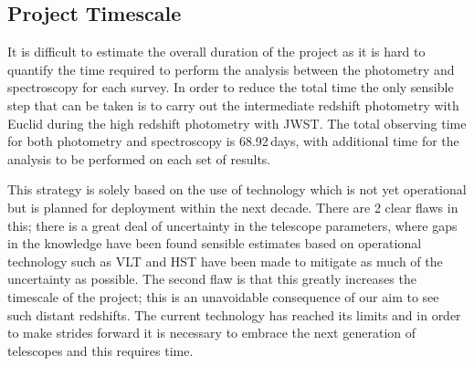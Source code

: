 	\subsection{Project Timescale} %
	\label{sub:project_timescale}
		It is difficult to estimate the overall duration of the project as it is hard to quantify the time required to perform the analysis between the photometry and spectroscopy for each survey. In order to reduce the total time the only sensible step that can be taken is to carry out the intermediate redshift photometry with Euclid during the high redshift photometry with JWST. The total observing time for both photometry and spectroscopy is 68.92\,days, with additional time for the analysis to be performed on each set of results.

		This strategy is solely based on the use of technology which is not yet operational but is planned for deployment within the next decade. There are 2 clear flaws in this; there is a great deal of uncertainty in the telescope parameters, where gaps in the knowledge have been found sensible estimates based on operational technology such as VLT and HST have been made to mitigate as much of the uncertainty as possible. The second flaw is that this greatly increases the timescale of the project; this is an unavoidable consequence of our aim to see such distant redshifts. The current technology has reached its limits and in order to make strides forward it is necessary to embrace the next generation of telescopes and this requires time.

